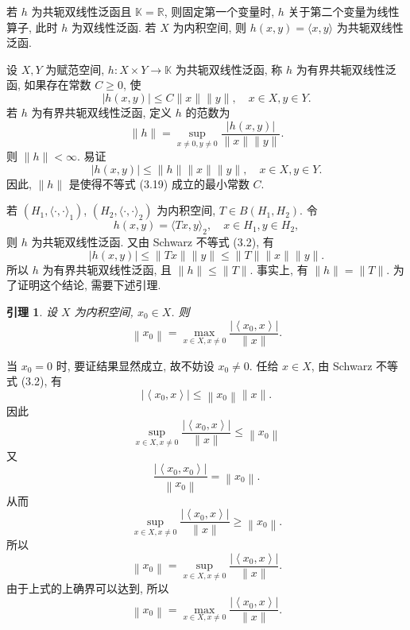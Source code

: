\documentclass[openany]{ctexbook}
\makeatletter
\theoremstyle{kaiti}
\newtheorem{lemma}{引理}[section]
\theoremstyle{normal}
\renewenvironment{proof}[1][\proofname]{\par
    \pushQED{\qed}%
    \normalfont \topsep6\p@\@plus6\p@\relax
    \trivlist
    \item\relax
    {\heiti #1}\hspace{2\labelsep}\ignorespaces
  }{%
    \popQED\endtrivlist\@endpefalse
  }
\makeatother
\begin{document}
若 $h$ 为共轭双线性泛函且 $\mathbb{K}=\mathbb{R}$, 则固定第一个变量时, $h$ 关于第二个变量为线性算子, 此时 $h$ 为双线性泛函. 若 $X$ 为内积空间, 则 $h(x, y)=\langle x, y\rangle$ 为共轭双线性泛函.

设 $X, Y$ 为赋范空间, $h: X \times Y \rightarrow \mathbb{K}$ 为共轭双线性泛函, 称 $h$ 为有界共轭双线性泛函, 如果存在常数 $C \geqslant 0$, 使
\begin{equation}
  |h(x, y)| \leqslant C\|x\|\|y\|, \quad x \in X, y \in Y.
\end{equation}
若 $h$ 为有界共轭双线性泛函, 定义 $h$ 的范数为
$$
\|h\|=\sup_{x \neq 0, y \neq 0} \frac{|h(x, y)|}{\|x\|\|y\|}.
$$
则 $\|h\|<\infty$. 易证
$$
|h(x, y)| \leqslant\|h\|\|x\|\|y\|, \quad x \in X, y \in Y.
$$
因此, $\|h\|$ 是使得不等式 (3.19) 成立的最小常数 $C$.

若 $\left(H_1,\langle\cdot, \cdot\rangle_1\right)$, $\left(H_2,\langle\cdot, \cdot\rangle_2\right)$ 为内积空间, $T \in B\left(H_1, H_2\right)$. 令
\begin{equation}
  h(x, y)=\langle T x, y\rangle_2, \quad x \in H_1, y \in H_2,
\end{equation}
则 $h$ 为共轭双线性泛函. 又由 Schwarz 不等式 (3.2), 有
$$
|h(x, y)| \leqslant\|T x\|\|y\| \leqslant\|T\|\|x\|\|y\|.
$$
所以 $h$ 为有界共轭双线性泛函, 且 $\|h\| \leqslant\|T\|$. 事实上, 有 $\|h\|=\|T\|$. 为了证明这个结论, 需要下述引理.

\begin{lemma}
设 $X$ 为内积空间, $x_0 \in X$. 则
$$
\left\|x_0\right\|=\max_{x \in X, x \neq 0} \frac{\left|\left\langle x_0, x\right\rangle\right|}{\|x\|}.
$$
\end{lemma}

\begin{proof}
当 $x_0=0$ 时, 要证结果显然成立, 故不妨设 $x_0 \neq 0$. 任给 $x \in X$, 由 Schwarz 不等式 (3.2), 有
$$
\left|\left\langle x_0, x\right\rangle\right| \leqslant\left\|x_0\right\|\|x\|.
$$
因此
$$
\sup_{x \in X, x \neq 0} \frac{\left|\left\langle x_0, x\right\rangle\right|}{\|x\|} \leqslant\left\|x_0\right\|
$$
又
$$
\frac{\left|\left\langle x_0, x_0\right\rangle\right|}{\left\|x_0\right\|}=\left\|x_0\right\|.
$$
从而
$$
\sup_{x \in X, x \neq 0} \frac{\left|\left\langle x_0, x\right\rangle\right|}{\|x\|} \geqslant\left\|x_0\right\|.
$$
所以
$$
\left\|x_0\right\|=\sup_{x \in X, x \neq 0} \frac{\left|\left\langle x_0, x\right\rangle\right|}{\|x\|}.
$$
由于上式的上确界可以达到, 所以
$$
\left\|x_0\right\|=\max_{x \in X, x \neq 0} \frac{\left|\left\langle x_0, x\right\rangle\right|}{\|x\|}.
$$
\end{proof}
\end{document}
